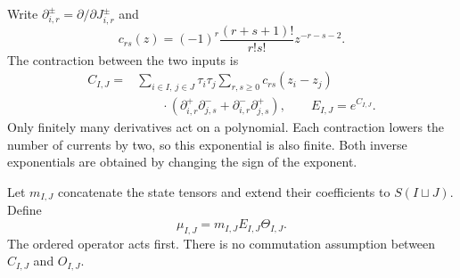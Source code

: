 Write \(\partial_{i,r}^\pm=\partial/\partial J_{i,r}^\pm\) and
\begin{equation}\label{wo:eq:jet-kernel}
 c_{rs}(z)=(-1)^r\frac{(r+s+1)!}{r!s!}z^{-r-s-2}.
\end{equation}
The contraction between the two inputs is
\begin{equation}\label{wo:eq:wick}
 \begin{split}
 C_{I,J}={}&\sum_{i\in I,\ j\in J}\tau_i\tau_j
       \sum_{r,s\ge0}c_{rs}(z_i-z_j)\\
 &\hspace{2em}\cdot
 \left(\partial_{i,r}^+\partial_{j,s}^-
       +\partial_{i,r}^-\partial_{j,s}^+\right),
 \qquad E_{I,J}=e^{C_{I,J}}.
 \end{split}
\end{equation}
Only finitely many derivatives act on a polynomial.  Each contraction
lowers the number of currents by two, so this exponential is also
finite.  Both inverse exponentials are obtained by changing the
sign of the exponent.

Let \(m_{I,J}\) concatenate the state tensors and extend their
coefficients to \(S(I\sqcup J)\).  Define
\begin{equation}\label{wo:eq:product}
 \mu_{I,J}=m_{I,J}E_{I,J}\Theta_{I,J}.
\end{equation}
The ordered operator acts first.  There is no commutation assumption
between \(C_{I,J}\) and \(O_{I,J}\).

